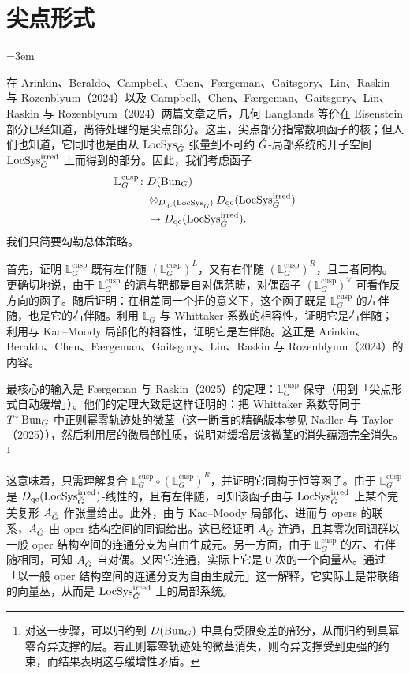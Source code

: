 \section{尖点形式}
\emergencystretch=3em

在 Arinkin、Beraldo、Campbell、Chen、Færgeman、Gaitsgory、Lin、Raskin 与 Rozenblyum（2024）以及 Campbell、Chen、Færgeman、Gaitsgory、Lin、Raskin 与 Rozenblyum（2024）两篇文章之后，几何 Langlands 等价在 Eisenstein 部分已经知道，尚待处理的是尖点部分。这里，尖点部分指常数项函子的核；但人们也知道，它同时也是由从 $\operatorname{LocSys}_{\check{G}}$ 张量到不可约 $\check{G}$-局部系统的开子空间 $\operatorname{LocSys}^{\mathrm{irred}}_{\check{G}}$ 上而得到的部分。因此，我们考虑函子
\[
\begin{aligned}
\mathbb{L}^{\mathrm{cusp}}_G\colon{}& D(\operatorname{Bun}_G)\\
&{}\otimes_{D_{\mathrm{qc}}(\operatorname{LocSys}_{\check{G}})}D_{\mathrm{qc}}(\operatorname{LocSys}^{\mathrm{irred}}_{\check{G}})\\
&{}\to D_{\mathrm{qc}}(\operatorname{LocSys}^{\mathrm{irred}}_{\check{G}}).
\end{aligned}
\]
我们只简要勾勒总体策略。

首先，证明 $\mathbb{L}^{\mathrm{cusp}}_G$ 既有左伴随 $(\mathbb{L}^{\mathrm{cusp}}_G)^L$，又有右伴随 $(\mathbb{L}^{\mathrm{cusp}}_G)^R$，且二者同构。更确切地说，由于 $\mathbb{L}^{\mathrm{cusp}}_G$ 的源与靶都是自对偶范畴，对偶函子 $(\mathbb{L}^{\mathrm{cusp}}_G)^{\vee}$ 可看作反方向的函子。随后证明：在相差同一个扭的意义下，这个函子既是 $\mathbb{L}^{\mathrm{cusp}}_G$ 的左伴随，也是它的右伴随。利用 $\mathbb{L}_G$ 与 Whittaker 系数的相容性，证明它是右伴随；利用与 Kac--Moody 局部化的相容性，证明它是左伴随。这正是 Arinkin、Beraldo、Chen、Færgeman、Gaitsgory、Lin、Raskin 与 Rozenblyum（2024）的内容。

最核心的输入是 Færgeman 与 Raskin（2025）的定理：$\mathbb{L}^{\mathrm{cusp}}_G$ 保守（用到「尖点形式自动缓增」）。他们的定理大致是这样证明的：把 Whittaker 系数等同于 $T^*\operatorname{Bun}_G$ 中正则幂零轨迹处的微茎（这一断言的精确版本参见 Nadler 与 Taylor（2025）），然后利用层的微局部性质，说明对缓增层该微茎的消失蕴涵完全消失。\footnote{对这一步骤，可以归约到 $D(\operatorname{Bun}_G)$ 中具有受限变差的部分，从而归约到具幂零奇异支撑的层。若正则幂零轨迹处的微茎消失，则奇异支撑受到更强的约束，而结果表明这与缓增性矛盾。}

这意味着，只需理解复合 $\mathbb{L}^{\mathrm{cusp}}_G\circ(\mathbb{L}^{\mathrm{cusp}}_G)^R$，并证明它同构于恒等函子。由于 $\mathbb{L}^{\mathrm{cusp}}_G$ 是 $D_{\mathrm{qc}}(\operatorname{LocSys}^{\mathrm{irred}}_{\check{G}})$-线性的，且有左伴随，可知该函子由与 $\operatorname{LocSys}^{\mathrm{irred}}_{\check{G}}$ 上某个完美复形 $A_{\check{G}}$ 作张量给出。此外，由与 Kac--Moody 局部化、进而与 opers 的联系，$A_{\check{G}}$ 由 oper 结构空间的同调给出。这已经证明 $A_{\check{G}}$ 连通，且其零次同调群以一般 oper 结构空间的连通分支为自由生成元。另一方面，由于 $\mathbb{L}^{\mathrm{cusp}}_G$ 的左、右伴随相同，可知 $A_{\check{G}}$ 自对偶。又因它连通，实际上它是 0 次的一个向量丛。通过「以一般 oper 结构空间的连通分支为自由生成元」这一解释，它实际上是带联络的向量丛，从而是 $\operatorname{LocSys}^{\mathrm{irred}}_{\check{G}}$ 上的局部系统。

